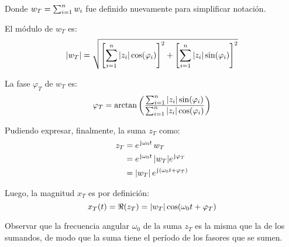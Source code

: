 \documentclass[a5paper,12pt,twoside]{book}
\begin{document}
Donde $w_T=\sum_{i=1}^n w_i$ fue definido nuevamente para simplificar notación.

El módulo de $w_T$ es:
\begin{equation*}
    {\left| {w_T} \right|} = \sqrt{\left[ \sum_{i=1}^n {\left| {z_i} \right|} \cos(\varphi_i) \right]^2 + \left[ \sum_{i=1}^n {\left| {z_i} \right|} \sin(\varphi_i) \right]^2}
\end{equation*}

La fase $\varphi_T$ de $w_T$ es:
\begin{equation*}
    \varphi_T = \arctan \left( \frac{\sum_{i=1}^n {\left| {z_i} \right|} \sin(\varphi_i)}{\sum_{i=1}^n {\left| {z_i} \right|} \cos(\varphi_i)} \right)
\end{equation*}

Pudiendo expresar, finalmente, la suma $z_T$ como:
\begin{align*}
    z_T  &= e^{\mkern2mu\mathrm{j}\mkern1mu \omega_0 t} \, w_T
    \\
    &= e^{\mkern2mu\mathrm{j}\mkern1mu \omega_0 t} \, {\left| {w_T} \right|} e^{\mkern2mu\mathrm{j}\mkern1mu \varphi_T}
    \\
    &= {\left| {w_T} \right|} \, e^{\mkern2mu\mathrm{j}\mkern1mu(\omega_0 t + \varphi_T)}
\end{align*}

Luego, la magnitud $x_T$ es por definición:
\begin{equation*}
    x_T(t) = \Re(z_T) = {\left| {w_T} \right|} \cos(\omega_0 t + \varphi_T)
\end{equation*}

Observar que la frecuencia angular $\omega_0$ de la suma $z_T$ es la misma que la de los sumandos, de modo que la suma tiene el período de los fasores que se sumen.


\end{document}
